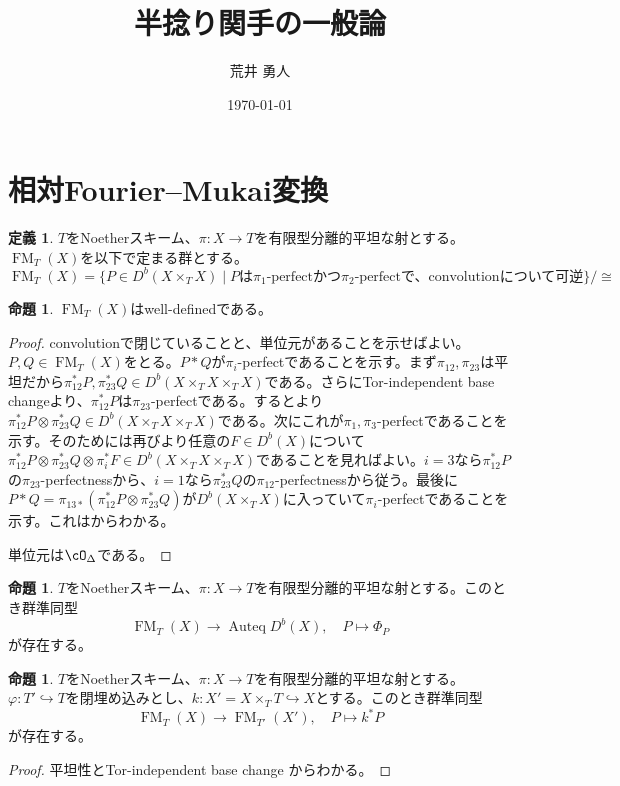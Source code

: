 \documentclass[uplatex, a4paper, dvipdfmx]{jsarticle}
\title{半捻り関手の一般論}
\author{荒井 勇人}
\date{\today}
\theoremstyle{definition}
\newtheorem{definition}[theorem]{定義}
\newtheorem{proposition}[theorem]{命題}
\DeclareMathOperator{\Auteq}{\mathrm{Auteq}}
\DeclareMathOperator{\FM}{\mathrm{FM}}
\begin{document}
\maketitle
\section{相対Fourier--Mukai変換}
\begin{definition}
    $T$をNoetherスキーム、$\pi \colon X \to T$を有限型分離的平坦な射とする。
    $\FM_T(X)$を以下で定まる群とする。
    \begin{equation}
        \FM_T(X) = \{P \in D^b(X \times_T X) \mid P \text{は$\pi_1$-perfectかつ$\pi_2$-perfectで、convolutionについて可逆}\}/\cong
    \end{equation}
\end{definition}
\begin{proposition}
    $\FM_T(X)$はwell-definedである。
\end{proposition}
\begin{proof}
    convolutionで閉じていることと、単位元があることを示せばよい。
    $P, Q \in \FM_T(X)$をとる。$P*Q$が$\pi_i$-perfectであることを示す。まず$\pi_{12}, \pi_{23}$は平坦だから$\pi_{12}^*P, \pi_{23}^*Q \in D^b(X \times_T X \times_T X)$である。さらにTor-independent base changeより、$\pi_{12}^*P$は$\pi_{23}$-perfectである。すると\cite[Lemma 5.1]{MR3720794}より$\pi_{12}^*P \otimes \pi_{23}^*Q \in D^b(X \times_T X \times_T X)$である。次にこれが$\pi_1, \pi_3$-perfectであることを示す。そのためには再び\cite[Lemma 5.1]{MR3720794}より任意の$F \in D^b(X)$について$\pi_{12}^*P \otimes \pi_{23}^*Q \otimes \pi_i^*F \in D^b(X \times_T X \times_T X)$であることを見ればよい。$i=3$なら$\pi_{12}^*P$の$\pi_{23}$-perfectnessから、$i=1$なら$\pi_{23}^*Q$の$\pi_{12}$-perfectnessから従う。最後に$P * Q = \pi_{13*}(\pi_{12}^*P \otimes \pi_{23}^*Q)$が$D^b(X\times_T X)$に入っていて$\pi_{i}$-perfectであることを示す。これは\cite[Proposition 2.7]{MR3720794}からわかる。

    単位元は$\cO_\Delta$である。
\end{proof}

\begin{proposition}
    $T$をNoetherスキーム、$\pi \colon X \to T$を有限型分離的平坦な射とする。このとき群準同型
    \begin{equation}
        \FM_T(X) \to \Auteq D^b(X), \quad P \mapsto \Phi_P
    \end{equation}
    が存在する。
\end{proposition}
\begin{proposition}
    $T$をNoetherスキーム、$\pi \colon X \to T$を有限型分離的平坦な射とする。$\varphi \colon T' \hookrightarrow T$を閉埋め込みとし、$k \colon X' = X \times_T T \hookrightarrow X$とする。このとき群準同型
    \begin{equation}
        \FM_T(X) \to \FM_{T'}(X'), \quad P \mapsto k^*P
    \end{equation}
    が存在する。
\end{proposition}
\begin{proof}
    平坦性とTor-independent base change からわかる。
\end{proof}
\end{document}
